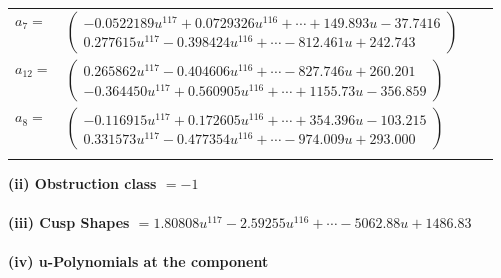 \documentclass[1p]{elsarticle_modified}
\theoremstyle{definition}
\begin{document}
\begin{tabular}{m{7pt} m{180pt} m{7pt} m{180pt} }
\flushright $a_{7}=$&$\begin{pmatrix}-0.0522189 u^{117}+0.0729326 u^{116}+\cdots+149.893 u-37.7416\\0.277615 u^{117}-0.398424 u^{116}+\cdots-812.461 u+242.743\end{pmatrix}$ \\
\flushright $a_{12}=$&$\begin{pmatrix}0.265862 u^{117}-0.404606 u^{116}+\cdots-827.746 u+260.201\\-0.364450 u^{117}+0.560905 u^{116}+\cdots+1155.73 u-356.859\end{pmatrix}$ \\
\flushright $a_{8}=$&$\begin{pmatrix}-0.116915 u^{117}+0.172605 u^{116}+\cdots+354.396 u-103.215\\0.331573 u^{117}-0.477354 u^{116}+\cdots-974.009 u+293.000\end{pmatrix}$\\&\end{tabular}
\flushleft \textbf{(ii) Obstruction class $= -1$}\\~\\
\flushleft \textbf{(iii) Cusp Shapes $= 1.80808 u^{117}-2.59255 u^{116}+\cdots-5062.88 u+1486.83$}\\~\\
\newpage\renewcommand{\arraystretch}{1}
\flushleft \textbf{(iv) u-Polynomials at the component}\newline \\
\end{document}
